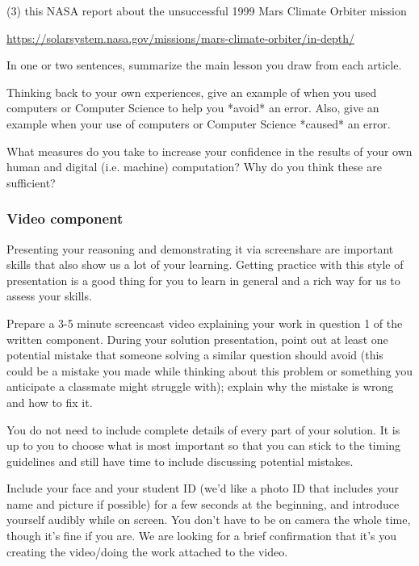 \documentclass[12pt, oneside]{article}
\begin{document}
\begin{enumerate}
(3) this NASA report about the unsuccessful 1999 Mars Climate Orbiter mission

\url{https://solarsystem.nasa.gov/missions/mars-climate-orbiter/in-depth/}

In one or two sentences, summarize the main lesson you draw from each article.

Thinking back to your own experiences, give an example of when you used computers or Computer Science
to help you *avoid* an error. Also, give an example when your use of computers or Computer Science
*caused* an error.

What measures do you take to increase your confidence in the results of your own human and digital 
(i.e. machine) computation? Why do you think these are sufficient?


\end{enumerate}

\subsubsection*{Video component}

Presenting your reasoning and demonstrating it via screenshare are important skills that 
also show us a lot of your learning. Getting practice with this style of presentation 
is a good thing for you to learn in general and a rich way for us to assess your skills. 

Prepare a 3-5 minute screencast video explaining your work in question 1 of the written component.
During your solution presentation, point out at least one potential mistake that someone 
solving a similar question should avoid (this could be a mistake you made while thinking 
about this problem or something you anticipate a classmate might struggle with); 
explain why the mistake is wrong and how to fix it. 

You do not need to include complete details of every part of your solution. 
It is up to you to choose what is most important so that you can stick to the 
timing guidelines and still have time to include discussing potential mistakes.

Include your face and your student ID (we'd like a photo ID that includes your name 
and picture if possible) for a few seconds at the beginning, and introduce yourself 
audibly while on screen. You don't have to be on camera the whole time, though it's fine 
if you are. We are looking for a brief confirmation that it's you creating the 
video/doing the work attached to the video.
\end{document}
